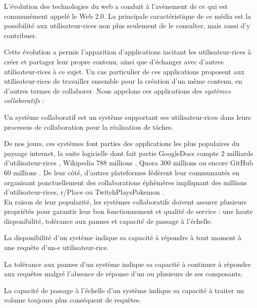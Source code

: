 \label{sec:intro-contexte}

L'évolution des technologies du web a conduit à l'avènement de ce qui est communément appelé le Web 2.0.
La principale caractéristique de ce média est la possibilité aux utilisateur-rices non plus seulement de le consulter, mais aussi d'y contribuer.

Cette évolution a permis l'apparition d'applications incitant les utilisateur-rices à créer et partager leur propre contenu, ainsi que d'échanger avec d'autres utilisateur-rices à ce sujet.
Un cas particulier de ces applications proposent aux utilisateur-rices de travailler ensemble pour la création d'un même contenu, en d'autres termes de collaborer.
Nous appelons ces applications des \emph{systèmes collaboratifs} :
\begin{definition}
  \label{def:collaborative-system}
  Un système collaboratif est un système supportant ses utilisateur-rices dans leurs processus de collaboration pour la réalisation de tâches.
\end{definition}

De nos jours, ces systèmes font parties des applications les plus populaires du paysage internet, \eg la suite logicielle dont fait partie GoogleDocs compte 2 milliards d'utilisateur-rices \cite{2020-google-g-suite-users}, Wikipedia 788 millions \cite{2022-09-monthly-active-users-wikipedia}, Quora 300 millions \cite{2022-01-monthly-active-users-social-networks} ou encore GitHub 60 millions \cite{2022-github-users}.
De leur côté, d'autres plateformes fédèrent leur communautés en organisant ponctuellement des collaborations éphémères impliquant des millions d'utilisateur-rices, \eg r/Place \cite{2022-rplace} ou TwitchPlaysPokemon \cite{2014-twitch-plays-pokemon}.\\

En raison de leur popularité, les systèmes collaboratifs doivent assurer plusieurs propriétés pour garantir leur bon fonctionnement et qualité de service : une haute disponibilité, tolérance aux pannes et capacité de passage à l'échelle.
\begin{definition}[Disponibilité]
  \label{def:availability}
  La disponibilité d'un système indique sa capacité à répondre à tout moment à une requête d'un-e utilisateur-rice.
\end{definition}
\begin{definition}
  La tolérance aux pannes d'un système indique sa capacité à continuer à répondre aux requêtes malgré l'absence de réponse d'un ou plusieurs de ses composants.
\end{definition}
\begin{definition}
  La capacité de passage à l'échelle d'un système indique sa capacité à traiter un volume toujours plus conséquent de requêtes.
\end{definition}

